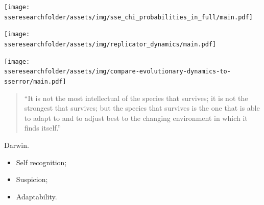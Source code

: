 \documentclass{beamer}
\newcommand{\sseresearchfolder}{$HOME/rsc/testing_for_ZD}
\begin{document}
\begin{frame}
    \begin{center}
    \texttt{[image: \\sseresearchfolder/assets/img/sse\_chi\_probabilities\_in\_full/main.pdf]}
    \end{center}
\end{frame}

\begin{frame}
    \begin{center}
        \texttt{[image: \\sseresearchfolder/assets/img/replicator\_dynamics/main.pdf]}
    \end{center}
\end{frame}

\begin{frame}
    \begin{center}
    \texttt{[image: \\sseresearchfolder/assets/img/compare-evolutionary-dynamics-to-sserror/main.pdf]}
    \end{center}
\end{frame}

\begin{frame}
    \begin{table}[!hbtp]
        \begin{center}
        \tiny
        
        \end{center}
    \end{table}
\end{frame}

\begin{frame}
    \Large
    \begin{quote}
        ``It is not the most intellectual of the species that survives; it is not the
        strongest that survives; but the species that survives is the one that is able
        to adapt to and to adjust best to the changing environment in which it finds
        itself.''
    \end{quote}
    \pause
    \begin{flushright}
        Darwin.
    \end{flushright}
\end{frame}

\begin{frame}
    \Huge
    \begin{itemize}
        \item Self recognition;
        \item Suspicion;
        \item Adaptability.
    \end{itemize}

\end{frame}
\end{document}
